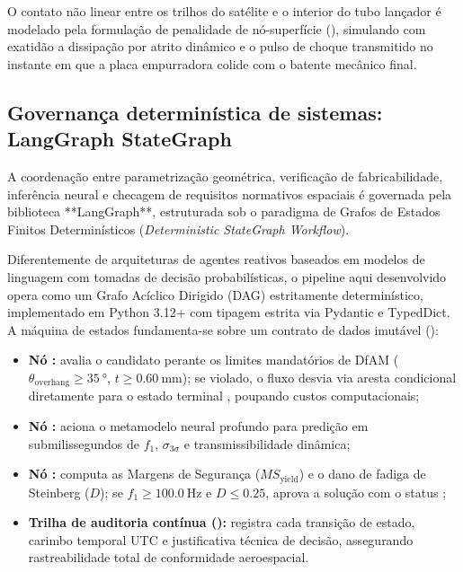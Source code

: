 O contato não linear entre os trilhos do satélite e o interior do tubo lançador é modelado pela formulação de penalidade de nó-superfície (), simulando com exatidão a dissipação por atrito dinâmico e o pulso de choque transmitido no instante em que a placa empurradora colide com o batente mecânico final.

\subsection{Governança determinística de sistemas: LangGraph StateGraph}
\label{subsec:langgraph-stack}

A coordenação entre parametrização geométrica, verificação de fabricabilidade, inferência neural e checagem de requisitos normativos espaciais é governada pela biblioteca **LangGraph**, estruturada sob o paradigma de Grafos de Estados Finitos Determinísticos (\textit{Deterministic StateGraph Workflow}).

Diferentemente de arquiteturas de agentes reativos baseados em modelos de linguagem com tomadas de decisão probabilísticas, o pipeline aqui desenvolvido opera como um Grafo Acíclico Dirigido (DAG) estritamente determinístico, implementado em Python 3.12+ com tipagem estrita via Pydantic e TypedDict. A máquina de estados fundamenta-se sobre um contrato de dados imutável ():
\begin{itemize}
  \item \textbf{Nó :} avalia o candidato perante os limites mandatórios de DfAM ($\theta_{\text{overhang}} \ge \SI{35}{\degree}$, $t \ge \SI{0.60}{\milli\metre}$); se violado, o fluxo desvia via aresta condicional diretamente para o estado terminal , poupando custos computacionais;
  \item \textbf{Nó :} aciona o metamodelo neural profundo para predição em submilissegundos de $f_1$, $\sigma_{3\sigma}$ e transmissibilidade dinâmica;
  \item \textbf{Nó :} computa as Margens de Segurança ($MS_{\text{yield}}$) e o dano de fadiga de Steinberg ($D$); se $f_1 \ge \SI{100.0}{\hertz}$ e $D \le \num{0.25}$, aprova a solução com o status ;
  \item \textbf{Trilha de auditoria contínua ():} registra cada transição de estado, carimbo temporal UTC e justificativa técnica de decisão, assegurando rastreabilidade total de conformidade aeroespacial.
\end{itemize}

